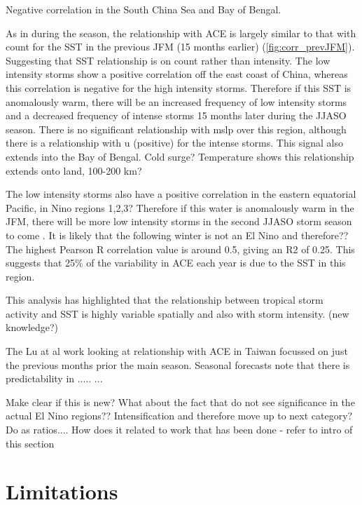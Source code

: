 Negative correlation in the South China Sea and Bay of Bengal. 


As in during the season, the relationship with ACE is largely similar to that with count for the SST in the previous JFM (15 months earlier) (\ref{fig:corr_prevJFM}). Suggesting that SST relationship is on count rather than intensity. The low intensity storms show a positive correlation off the east coast of China, whereas this correlation is negative for the high intensity storms. Therefore if this SST is anomalously warm, there will be an increased frequency of low intensity storms and a decreased frequency of intense storms 15 months later during the JJASO season. There is no significant relationship with mslp over this region, although there is a relationship with u (positive) for the intense storms. This signal also extends into the Bay of Bengal. Cold surge?  Temperature shows this relationship extends onto land, 100-200 km?

The low intensity storms also have a positive correlation in the eastern equatorial Pacific, in Nino regions 1,2,3? Therefore if this water is anomalously warm in the JFM, there will be more low intensity storms in the second JJASO storm season to come . It is likely that the following winter is not an El Nino and therefore??
The highest Pearson R correlation value is around 0.5, giving an R2 of 0.25. This suggests that 25\% of the variability in ACE each year is due to the SST in this region. 


This analysis has highlighted that the relationship between tropical storm activity and SST is highly variable spatially and also with storm intensity. (new knowledge?)

The Lu at al work looking at relationship with ACE in Taiwan focussed on just the previous months prior the main season. Seasonal forecasts note that there is predictability in ..... ...

Make clear if this is new?
What about the fact that do not see significance in the actual El Nino regions??
Intensification and therefore move up to next category? Do as ratios....
How does it related to work that has been done - refer to intro of this section


\section{Limitations}

